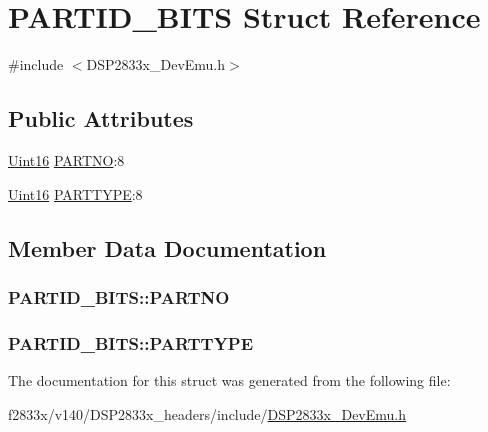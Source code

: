 \hypertarget{struct_p_a_r_t_i_d___b_i_t_s}{}\section{P\+A\+R\+T\+I\+D\+\_\+\+B\+I\+T\+S Struct Reference}
\label{struct_p_a_r_t_i_d___b_i_t_s}


{\ttfamily \#include $<$D\+S\+P2833x\+\_\+\+Dev\+Emu.\+h$>$}

\subsection*{Public Attributes}
\begin{DoxyCompactItemize}
\item 
\hyperlink{_d_s_p2833x___device_8h_a59a9f6be4562c327cbfb4f7e8e18f08b}{Uint16} \hyperlink{struct_p_a_r_t_i_d___b_i_t_s_aa85a2e08202f6b7ceb915f11cf1afd6b}{P\+A\+R\+T\+N\+O}\+:8
\item 
\hyperlink{_d_s_p2833x___device_8h_a59a9f6be4562c327cbfb4f7e8e18f08b}{Uint16} \hyperlink{struct_p_a_r_t_i_d___b_i_t_s_ab5a5d03b6a744544fde167d56ac539e2}{P\+A\+R\+T\+T\+Y\+P\+E}\+:8
\end{DoxyCompactItemize}


\subsection{Member Data Documentation}
\hypertarget{struct_p_a_r_t_i_d___b_i_t_s_aa85a2e08202f6b7ceb915f11cf1afd6b}{}
\subsubsection[{P\+A\+R\+T\+N\+O}]{ P\+A\+R\+T\+I\+D\+\_\+\+B\+I\+T\+S\+::\+P\+A\+R\+T\+N\+O}\label{struct_p_a_r_t_i_d___b_i_t_s_aa85a2e08202f6b7ceb915f11cf1afd6b}
\hypertarget{struct_p_a_r_t_i_d___b_i_t_s_ab5a5d03b6a744544fde167d56ac539e2}{}
\subsubsection[{P\+A\+R\+T\+T\+Y\+P\+E}]{ P\+A\+R\+T\+I\+D\+\_\+\+B\+I\+T\+S\+::\+P\+A\+R\+T\+T\+Y\+P\+E}\label{struct_p_a_r_t_i_d___b_i_t_s_ab5a5d03b6a744544fde167d56ac539e2}


The documentation for this struct was generated from the following file\+:\begin{DoxyCompactItemize}
\item 
f2833x/v140/\+D\+S\+P2833x\+\_\+headers/include/\hyperlink{_d_s_p2833x___dev_emu_8h}{D\+S\+P2833x\+\_\+\+Dev\+Emu.\+h}\end{DoxyCompactItemize}
